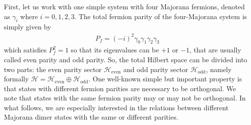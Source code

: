 \documentclass[%
 reprint,
 amsmath,amssymb,
 aps,
prb,
]{revtex4-2}
\begin{document}
First, let us work with one simple system with four Majorana fermions, denoted as $\gamma_i$ where $i=0,1,2,3$.
The total fermion parity of the four-Majorana system is simply given by
\begin{align}
P_f=(-i)^2\gamma_0\gamma_1\gamma_2\gamma_3
\label{eq:fermion_parity}
\end{align}
which satisfies $P_f^2=1$ so that its eigenvalues can be $+1$ or $-1$, that are usually called even parity and odd parity.
So, the total Hilbert space can be divided into two parts: the even parity sector $\mathcal{H}_{\text{even}}$ and odd parity sector $\mathcal{H}_{\text{odd}}$, namely formally $\mathcal{H}=\mathcal{H}_{\text{even}}\oplus \mathcal{H}_{\text{odd}}$.
One well-known simple but important property is that states with different fermion parities are necessary to be orthogonal.
We note that states with the same fermion parity may or may not be orthogonal.
In what follows, we are especially interested in the relations between different Majorana dimer states with the same or different parities.
\end{document}
